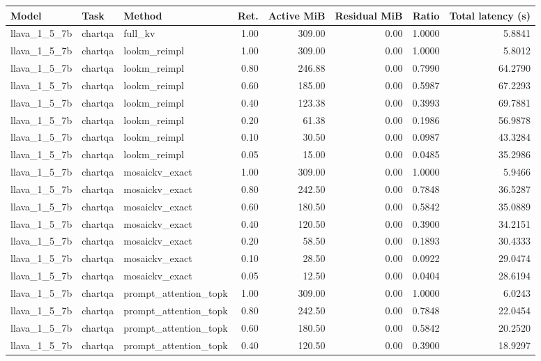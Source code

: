\begin{longtable}{lllrrrrr}
Model & Task & Method & Ret. & Active MiB & Residual MiB & Ratio & Total latency (s) \\
\hline
llava\_1\_5\_7b & chartqa & full\_kv & 1.00 & 309.00 & 0.00 & 1.0000 & 5.8841 \\
llava\_1\_5\_7b & chartqa & lookm\_reimpl & 1.00 & 309.00 & 0.00 & 1.0000 & 5.8012 \\
llava\_1\_5\_7b & chartqa & lookm\_reimpl & 0.80 & 246.88 & 0.00 & 0.7990 & 64.2790 \\
llava\_1\_5\_7b & chartqa & lookm\_reimpl & 0.60 & 185.00 & 0.00 & 0.5987 & 67.2293 \\
llava\_1\_5\_7b & chartqa & lookm\_reimpl & 0.40 & 123.38 & 0.00 & 0.3993 & 69.7881 \\
llava\_1\_5\_7b & chartqa & lookm\_reimpl & 0.20 & 61.38 & 0.00 & 0.1986 & 56.9878 \\
llava\_1\_5\_7b & chartqa & lookm\_reimpl & 0.10 & 30.50 & 0.00 & 0.0987 & 43.3284 \\
llava\_1\_5\_7b & chartqa & lookm\_reimpl & 0.05 & 15.00 & 0.00 & 0.0485 & 35.2986 \\
llava\_1\_5\_7b & chartqa & mosaickv\_exact & 1.00 & 309.00 & 0.00 & 1.0000 & 5.9466 \\
llava\_1\_5\_7b & chartqa & mosaickv\_exact & 0.80 & 242.50 & 0.00 & 0.7848 & 36.5287 \\
llava\_1\_5\_7b & chartqa & mosaickv\_exact & 0.60 & 180.50 & 0.00 & 0.5842 & 35.0889 \\
llava\_1\_5\_7b & chartqa & mosaickv\_exact & 0.40 & 120.50 & 0.00 & 0.3900 & 34.2151 \\
llava\_1\_5\_7b & chartqa & mosaickv\_exact & 0.20 & 58.50 & 0.00 & 0.1893 & 30.4333 \\
llava\_1\_5\_7b & chartqa & mosaickv\_exact & 0.10 & 28.50 & 0.00 & 0.0922 & 29.0474 \\
llava\_1\_5\_7b & chartqa & mosaickv\_exact & 0.05 & 12.50 & 0.00 & 0.0404 & 28.6194 \\
llava\_1\_5\_7b & chartqa & prompt\_attention\_topk & 1.00 & 309.00 & 0.00 & 1.0000 & 6.0243 \\
llava\_1\_5\_7b & chartqa & prompt\_attention\_topk & 0.80 & 242.50 & 0.00 & 0.7848 & 22.0454 \\
llava\_1\_5\_7b & chartqa & prompt\_attention\_topk & 0.60 & 180.50 & 0.00 & 0.5842 & 20.2520 \\
llava\_1\_5\_7b & chartqa & prompt\_attention\_topk & 0.40 & 120.50 & 0.00 & 0.3900 & 18.9297 \\

\end{longtable}
